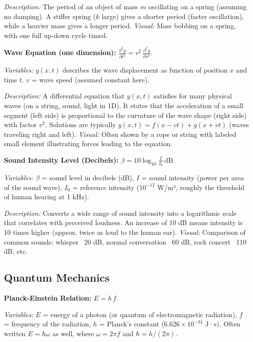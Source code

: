 \documentclass{article}
\begin{document}
\textit{Description:} The period of an object of mass $m$ oscillating on a spring (assuming no damping). A stiffer spring ($k$ large) gives a shorter period (faster oscillation), while a heavier mass gives a longer period. \textit{Visual:} Mass bobbing on a spring, with one full up-down cycle timed.

\textbf{Wave Equation (one dimension):} $\displaystyle \frac{\partial^2 y}{\partial t^2} = v^2\,\frac{\partial^2 y}{\partial x^2}$.

\textit{Variables:} $y(x,t)$ describes the wave displacement as function of position $x$ and time $t$. $v$ = wave speed (assumed constant here).

\textit{Description:} A differential equation that $y(x,t)$ satisfies for many physical waves (on a string, sound, light in 1D). It states that the acceleration of a small segment (left side) is proportional to the curvature of the wave shape (right side) with factor $v^2$. Solutions are typically $y(x,t)=f(x-vt)+g(x+vt)$ (waves traveling right and left). \textit{Visual:} Often shown by a rope or string with labeled small element illustrating forces leading to the equation.

\textbf{Sound Intensity Level (Decibels):} $\displaystyle \beta = 10 \log_{10}\!\frac{I}{I_0}\,\text{dB}$.

\textit{Variables:} $\beta$ = sound level in decibels (dB), $I$ = sound intensity (power per area of the sound wave), $I_0$ = reference intensity ($10^{-12}$ W/m², roughly the threshold of human hearing at 1 kHz).

\textit{Description:} Converts a wide range of sound intensity into a logarithmic scale that correlates with perceived loudness. An increase of 10 dB means intensity is 10 times higher (approx. twice as loud to the human ear). \textit{Visual:} Comparison of common sounds: whisper ~20 dB, normal conversation ~60 dB, rock concert ~110 dB, etc.

\subsection*{Quantum Mechanics}

\textbf{Planck-Einstein Relation:} $E = h\,f$.

\textit{Variables:} $E$ = energy of a photon (or quantum of electromagnetic radiation), $f$ = frequency of the radiation, $h$ = Planck’s constant ($6.626\times10^{-34}$ J·s). Often written $E = \hbar \omega$ as well, where $\omega = 2\pi f$ and $\hbar = h/(2\pi)$.
\end{document}
